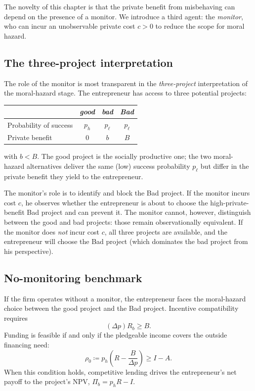 \documentclass[11pt,a4paper,oneside]{book}
\def\geq{\geqslant}
\theoremstyle{plain}
\theoremstyle{definition}
\theoremstyle{remark}
\numberwithin{equation}{chapter}
\begin{document}
The novelty of this chapter is that the private benefit from misbehaving can depend on the presence of a monitor.
We introduce a third agent: the \emph{monitor}, who can incur an unobservable private cost $c > 0$ to reduce the scope for moral hazard.

\subsection{The three-project interpretation}

The role of the monitor is most transparent in the \emph{three-project} interpretation of the moral-hazard stage.
The entrepreneur has access to three potential projects:

\begin{center}
\renewcommand{\arraystretch}{1.3}
\begin{tabular}{|l|c|c|c|}
\hline
 & \textit{good} & \textit{bad} & \textit{Bad} \\
\hline
Probability of success & $p_h$ & $p_\ell$ & $p_\ell$ \\
Private benefit & $0$ & $b$ & $B$ \\
\hline
\end{tabular}
\end{center}
with $b < B$.
The good project is the socially productive one; the two moral-hazard alternatives deliver the same (low) success probability $p_\ell$ but differ in the private benefit they yield to the entrepreneur.

The monitor's role is to identify and block the Bad project.
If the monitor incurs cost $c$, he observes whether the entrepreneur is about to choose the high-private-benefit Bad project and can prevent it.
The monitor cannot, however, distinguish between the good and bad projects: those remain observationally equivalent.
If the monitor does \emph{not} incur cost $c$, all three projects are available, and the entrepreneur will choose the Bad project (which dominates the bad project from his perspective).

\subsection{No-monitoring benchmark}

If the firm operates without a monitor, the entrepreneur faces the moral-hazard choice between the good project and the Bad project.
Incentive compatibility requires
\begin{equation}\label{eq:mon-IC-nomon}
  (\Delta p) R_b \geq B.
\end{equation}
Funding is feasible if and only if the pledgeable income covers the outside financing need:
\begin{equation}\label{eq:mon-pledge-nomon}
  \rho_0 \coloneqq p_h \left( R - \frac{B}{\Delta p} \right) \geq I - A.
\end{equation}
When this condition holds, competitive lending drives the entrepreneur's net payoff to the project's NPV, $\Pi_b = p_h R - I$.
\end{document}
